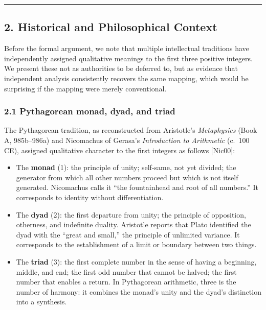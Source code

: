 \documentclass[
  11pt,
  letterpaper,
]{article}
\providecommand{\tightlist}{%
  \setlength{\itemsep}{0pt}\setlength{\parskip}{0pt}}
\begin{document}
\begin{center}\rule{0.5\linewidth}{0.5pt}\end{center}

\subsection{2. Historical and Philosophical
Context}\label{historical-and-philosophical-context}

Before the formal argument, we note that multiple intellectual
traditions have independently assigned qualitative meanings to the first
three positive integers. We present these not as authorities to be
deferred to, but as evidence that independent analysis consistently
recovers the same mapping, which would be surprising if the mapping were
merely conventional.

\subsubsection{2.1 Pythagorean monad, dyad, and
triad}\label{pythagorean-monad-dyad-and-triad}

The Pythagorean tradition, as reconstructed from Aristotle's
\emph{Metaphysics} (Book A, 985b--986a) and Nicomachus of Gerasa's
\emph{Introduction to Arithmetic} (c.~100 CE), assigned qualitative
character to the first integers as follows {[}Nic00{]}:

\begin{itemize}
\tightlist
\item
  The \textbf{monad} (1): the principle of unity; self-same, not yet
  divided; the generator from which all other numbers proceed but which
  is not itself generated. Nicomachus calls it ``the fountainhead and
  root of all numbers.'' It corresponds to identity without
  differentiation.
\item
  The \textbf{dyad} (2): the first departure from unity; the principle
  of opposition, otherness, and indefinite duality. Aristotle reports
  that Plato identified the dyad with the ``great and small,'' the
  principle of unlimited variance. It corresponds to the establishment
  of a limit or boundary between two things.
\item
  The \textbf{triad} (3): the first complete number in the sense of
  having a beginning, middle, and end; the first odd number that cannot
  be halved; the first number that enables a return. In Pythagorean
  arithmetic, three is the number of harmony: it combines the monad's
  unity and the dyad's distinction into a synthesis.
\end{itemize}
\end{document}
